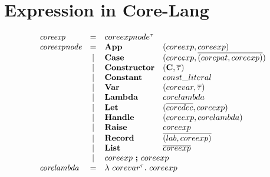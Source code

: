 \documentclass[11pt,a4paper]{article}
\newcommand{\key}[1]{\textrm{\textbf{#1}}}
\newcommand{\prodlhs}[1]{\textit{#1}}
\newcommand{\lam}  {\mathbf\lambda}
\newcommand{\vcon} {\mathbf{C}}
\newcommand{\vect}[1]{\overline{#1}}
\begin{document}
\section {Expression in Core-Lang}
{\renewcommand{\arraystretch}{1.2}\[
\begin{array}{lcll}
\prodlhs{coreexp}
	& = & \multicolumn{2}{l}{coreexpnode^\tau}				    \\
\prodlhs{coreexpnode}
    & = & \key{App}  & (coreexp, coreexp)						\\
    & | & \key{Case} & (coreexp, \vect{(corepat,coreexp)})   	\\
    & | & \key{Constructor} & (\vcon, \vect\tau)				\\
    & | & \key{Constant}	& const\_literal        			\\
    & | & \key{Var}  		& (corevar, \vect\tau)     		    \\ 
    & | & \key{Lambda}  	& corelambda						\\ 
    & | & \key{Let}			& (\vect{coredec}, coreexp)			\\
    & | & \key{Handle}		& (coreexp, corelambda)             \\
    & | & \key{Raise}		& coreexp							\\
    & | & \key{Record}		& \vect{(lab, coreexp)} 		    \\		 
    & | & \key{List}		& \vect{coreexp}					\\
    & | & \multicolumn{2}{l}{coreexp\ \key{;}\ coreexp}			\\
\prodlhs{corelambda}
	& = & \multicolumn{2}{l}{\lam\ corevar^\tau.\ coreexp}      \\
\end{array}
\]}
\end{document}
